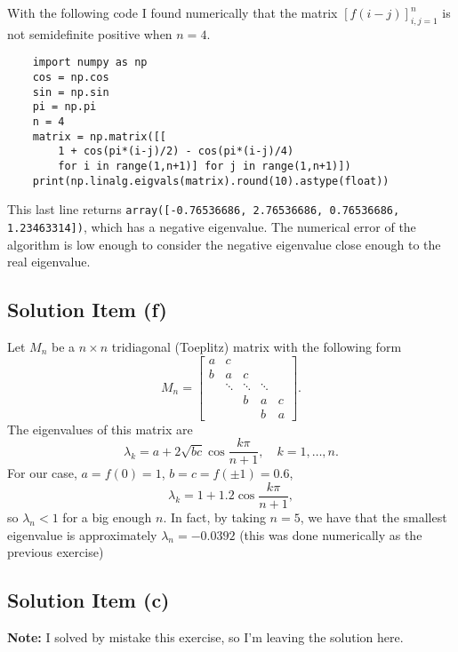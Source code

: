 With the following code I found numerically that the matrix $[f(i-j)]_{i,j = 1}^n$ is not semidefinite positive when $n = 4$.

\begin{verbatim}
    import numpy as np 
    cos = np.cos
    sin = np.sin
    pi = np.pi
    n = 4
    matrix = np.matrix([[
        1 + cos(pi*(i-j)/2) - cos(pi*(i-j)/4) 
        for i in range(1,n+1)] for j in range(1,n+1)])
    print(np.linalg.eigvals(matrix).round(10).astype(float))
\end{verbatim}

This last line returns \texttt{array([-0.76536686,  2.76536686,  0.76536686,  1.23463314])}, which has a negative eigenvalue. The numerical error of the algorithm is low enough to consider the negative eigenvalue close enough to the real eigenvalue.

\subsection*{Solution Item (f)}

Let $M_n$ be a $n\times n$ tridiagonal (Toeplitz) matrix with the following form
\[ M_n = \left[ \begin{matrix}
    a & c\\
    b & a & c\\
    &\ddots & \ddots&\ddots\\
    & & b & a & c\\
    & & & b & a
\end{matrix} \right] .\]
The eigenvalues of this matrix are 
\[ \lambda_k = a + 2\sqrt{bc} \cos\frac{k\pi}{n+1},\hspace{1em} k = 1,\ldots, n. \]
For our case, $a = f(0) = 1$, $b = c = f(\pm 1) = 0.6$, 
\[ \lambda_k = 1 + 1.2 \cos \frac{k\pi}{n+1}, \]
so $\lambda_{n} < 1$ for a big enough $n$. In fact, by taking $n = 5$, we have that the smallest eigenvalue is approximately $\lambda_n = -0.0392$ (this was done numerically as the previous exercise)


\subsection*{Solution Item (c)}

\textbf{Note:} I solved by mistake this exercise, so I'm leaving the solution here.

